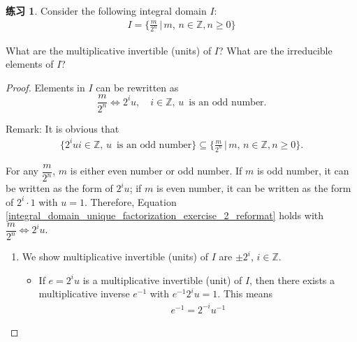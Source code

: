 \documentclass[utf8]{ctexbook}
\theoremstyle{definition}
\newtheorem{exercise}{练习}[section]
\begin{document}
\begin{exercise}\label{integral_domain_unique_factorization_exercise_2}
Consider the following integral domain $I$:
\begin{align*}
I = \{ \frac{m}{2^n} \, | \, m, \, n  \in \mathbb{Z}, n \geq 0 \}
\end{align*}

What are the multiplicative invertible (units) of $I$? What are the irreducible elements of $I$?
\end{exercise}

\begin{proof}
Elements in $I$ can be rewritten as
\begin{equation}\label{integral_domain_unique_factorization_exercise_2_reformat}
\frac{m}{2^n} \iff 2^i u , \quad i \in \mathbb{Z}, \, u \, \mbox{ is an odd number}.
\end{equation}

Remark: It is obvious that 
\begin{align*}
\{ 2^i u i \in \mathbb{Z}, \, u \, \mbox{ is an odd number} \} \subseteq \{ \frac{m}{2^n} \, | \, m, \, n  \in \mathbb{Z}, n \geq 0  \} .
\end{align*}

For any $\dfrac{m}{2^n} $, $m$ is either even number or odd number. If $m$ is odd number, it can be written as the form of $2^i u $; if $m$ is even number, it can be written as the form of $2^i \cdot 1$ with $u= 1$. Therefore, Equation \ref{integral_domain_unique_factorization_exercise_2_reformat} holds with $\dfrac{m}{2^n} \iff 2^i u $. 

\begin{enumerate}
\item{We show multiplicative invertible (units) of $I$ are $\pm 2^i$, $i \in \mathbb{Z}$.}
\begin{itemize}
\item{If $e = 2^i u$ is a multiplicative invertible (unit) of $I$, then there exists a multiplicative inverse $e^{-1}$ with $e^{-1} 2^i u = 1 $. This means 
\begin{align*}
e^{-1} = 2^{-i} u^{-1}
\end{align*}

}
\end{itemize}
\end{enumerate}
\end{proof}
\end{document}
